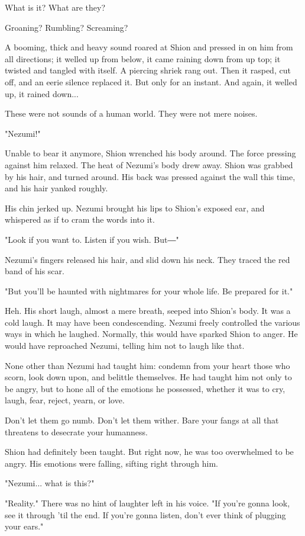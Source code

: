 What is it? What are they?

Groaning? Rumbling? Screaming?

A booming, thick and heavy sound roared at Shion and pressed in on him
from all directions; it welled up from below, it came raining down from
up top; it twisted and tangled with itself. A piercing shriek rang out.
Then it rasped, cut off, and an eerie silence replaced it. But only for
an instant. And again, it welled up, it rained down...

These were not sounds of a human world. They were not mere noises.

"Nezumi!"

Unable to bear it anymore, Shion wrenched his body around. The force
pressing against him relaxed. The heat of Nezumi's body drew away. Shion
was grabbed by his hair, and turned around. His back was pressed against
the wall this time, and his hair yanked roughly.

His chin jerked up. Nezumi brought his lips to Shion's exposed ear, and
whispered as if to cram the words into it.

"Look if you want to. Listen if you wish. But―"

Nezumi's fingers released his hair, and slid down his neck. They traced
the red band of his scar.

"But you'll be haunted with nightmares for your whole life. Be prepared
for it."

Heh. His short laugh, almost a mere breath, seeped into Shion's body. It
was a cold laugh. It may have been condescending. Nezumi freely
controlled the various ways in which he laughed. Normally, this would
have sparked Shion to anger. He would have reproached Nezumi, telling
him not to laugh like that.

None other than Nezumi had taught him: condemn from your heart those who
scorn, look down upon, and belittle themselves. He had taught him not
only to be angry, but to hone all of the emotions he possessed, whether
it was to cry, laugh, fear, reject, yearn, or love.

Don't let them go numb. Don't let them wither. Bare your fangs at all
that threatens to desecrate your humanness.

Shion had definitely been taught. But right now, he was too overwhelmed
to be angry. His emotions were falling, sifting right through him.

"Nezumi... what is this?"

"Reality." There was no hint of laughter left in his voice. "If you're
gonna look, see it through 'til the end. If you're gonna listen, don't
ever think of plugging your ears."


